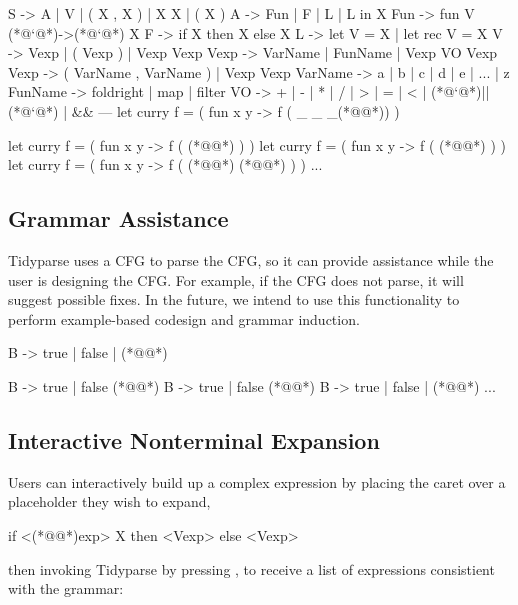 \documentclass[sigplan,review,anonymous,acmsmall]{acmart}\settopmatter{printfolios=false,printccs=false,printacmref=false}
\begin{document}
\begin{tidyinput}
S -> A | V | ( X , X ) | X X | ( X )
A -> Fun | F | L | L in X
Fun -> fun V (*@`@*)->(*@`@*) X
F -> if X then X else X
L -> let V = X | let rec V = X
V -> Vexp | ( Vexp ) | Vexp Vexp
Vexp -> VarName | FunName | Vexp VO Vexp
Vexp -> ( VarName , VarName ) | Vexp Vexp
VarName -> a | b | c | d | e | ... | z
FunName -> foldright | map | filter
VO ->  + | - | * | / | > | = | < | (*@`@*)||(*@`@*) | &&
---
let curry f = ( fun x y -> f ( _ _ _(*@\caret{ }@*)) )
\end{tidyinput}
\begin{tidyoutput}
let curry f = ( fun x y -> f ( (*@@*) ) )
let curry f = ( fun x y -> f ( (*@@*) ) )
let curry f = ( fun x y -> f ( (*@@*) (*@@*) ) )
...
\end{tidyoutput}

\subsection{Grammar Assistance}

Tidyparse uses a CFG to parse the CFG, so it can provide assistance while the user is designing the CFG. For example, if the CFG does not parse, it will suggest possible fixes. In the future, we intend to use this functionality to perform example-based codesign and grammar induction.

\begin{tidyinput}
B -> true | false | (*@\caret{ }@*)
\end{tidyinput}
\begin{tidyoutput}
B -> true | false (*@\hlred{ }@*)
B -> true | false (*@@*)
B -> true | false | (*@@*)
...
\end{tidyoutput}

\subsection{Interactive Nonterminal Expansion}

Users can interactively build up a complex expression by placing the caret over a placeholder they wish to expand,

\begin{tidyinput}
if <(*@@*)exp> X then <Vexp> else <Vexp>
\end{tidyinput}

\noindent then invoking Tidyparse by pressing \keys{\ctrl + \SPACE}, to receive a list of expressions consistient with the grammar:
\end{document}

